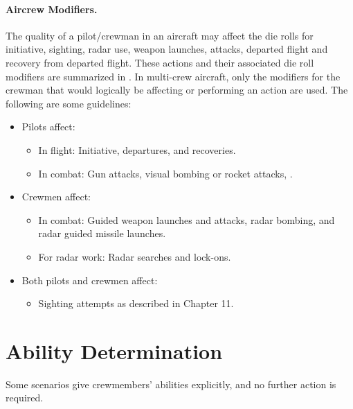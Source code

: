 \begin{advancedrules}
{\paragraph{Aircrew Modifiers.} The quality of a pilot/crewman in an aircraft may affect the die rolls for initiative, sighting, radar use, weapon launches, attacks, departed flight and recovery from departed flight. These actions and their associated die roll modifiers are summarized in . In multi-crew aircraft, only the modifiers for the crewman that would logically be affecting or performing an action are used. The following are some guidelines:

\begin{itemize}
\item Pilots affect:
\begin{itemize}
    \item In flight: Initiative, departures, and recoveries.
    \item In combat: Gun attacks, visual bombing or rocket attacks, .
\end{itemize}

\item Crewmen affect:
\begin{itemize}
    \item In combat: Guided weapon launches and attacks, radar bombing, and radar guided missile launches.
    \item For radar work:  Radar searches and lock-ons.
\end{itemize}

\item Both pilots and crewmen affect:
\begin{itemize}
    \item Sighting attempts as described in Chapter 11.
\end{itemize}
\end{itemize}

}{

\section{Ability Determination}
\label{rule:crew-determination}

Some scenarios give crewmembers’ abilities explicitly, and no further action is required.

}
\end{advancedrules}
